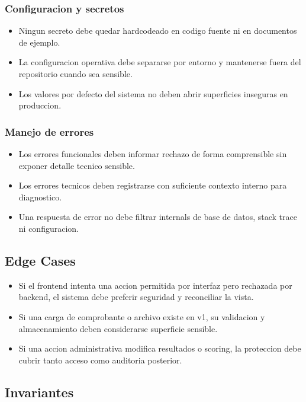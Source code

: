 \subsubsection{Configuracion y secretos}

\begin{itemize}
  \item Ningun secreto debe quedar hardcodeado en codigo fuente ni en documentos de ejemplo.
  \item La configuracion operativa debe separarse por entorno y mantenerse fuera del repositorio cuando sea sensible.
  \item Los valores por defecto del sistema no deben abrir superficies inseguras en produccion.
\end{itemize}

\subsubsection{Manejo de errores}

\begin{itemize}
  \item Los errores funcionales deben informar rechazo de forma comprensible sin exponer detalle tecnico sensible.
  \item Los errores tecnicos deben registrarse con suficiente contexto interno para diagnostico.
  \item Una respuesta de error no debe filtrar internals de base de datos, stack trace ni configuracion.
\end{itemize}

\subsection{Edge Cases}

\begin{itemize}
  \item Si el frontend intenta una accion permitida por interfaz pero rechazada por backend, el sistema debe preferir seguridad y reconciliar la vista.
  \item Si una carga de comprobante o archivo existe en v1, su validacion y almacenamiento deben considerarse superficie sensible.
  \item Si una accion administrativa modifica resultados o scoring, la proteccion debe cubrir tanto acceso como auditoria posterior.
\end{itemize}

\subsection{Invariantes}


